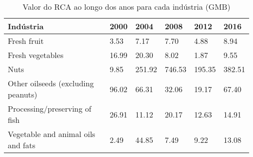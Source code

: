 \begin{table}
\centering
\caption{Valor do RCA ao longo dos anos para cada indústria (GMB)}
\begin{tabular}{p{6cm}p{1.5cm}p{1.5cm}p{1.5cm}p{1.5cm}p{1.5cm}}
\toprule
                         Indústria &  2000 &   2004 &   2008 &   2012 &   2016 \\
\midrule
                       Fresh fruit &  3.53 &   7.17 &   7.70 &   4.88 &   8.94 \\
                  Fresh vegetables & 16.99 &  20.30 &   8.02 &   1.87 &   9.55 \\
                              Nuts &  9.85 & 251.92 & 746.53 & 195.35 & 382.51 \\
Other oilseeds (excluding peanuts) & 96.02 &  66.31 &  32.06 &  19.17 &  67.40 \\
     Processing/preserving of fish & 26.91 &  11.12 &  20.17 &  12.63 &  14.91 \\
Vegetable and animal oils and fats &  2.49 &  44.85 &   7.49 &   9.22 &  13.08 \\
\bottomrule
\end{tabular}
\end{table}
